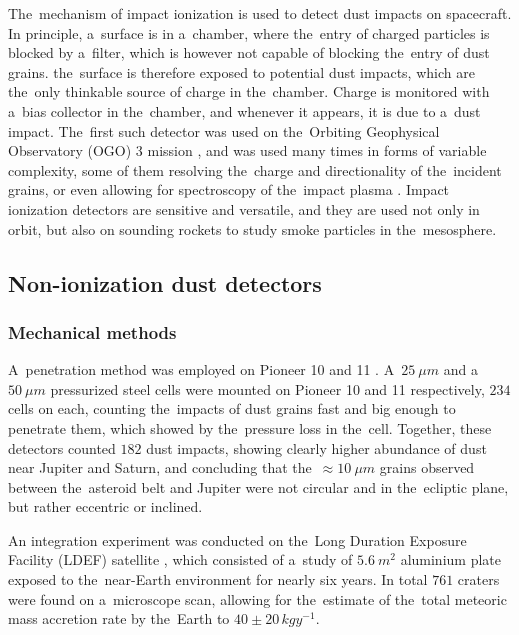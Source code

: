 The~mechanism of impact ionization is used to detect dust impacts on spacecraft. In principle, a~surface is in a~chamber, where the~entry of charged particles is blocked by a~filter, which is however not capable of blocking the~entry of dust grains.  the~surface is therefore exposed to potential dust impacts, which are the~only thinkable source of charge in the~chamber. Charge is monitored with a~bias collector in the~chamber, and whenever it appears, it is due to a~dust impact. The~first such detector was used on the~Orbiting Geophysical Observatory ({OGO}) 3 mission \citep{alexander1968zodiacal}, and was used many times in forms of variable complexity, some of them resolving the~charge and directionality \citep{grun1992galileo,grun1992ulysses,berg1969pioneer} of the~incident grains, or even allowing for spectroscopy of the~impact plasma \citep{srama2004cassini,sommer2023measuring}. Impact ionization detectors are sensitive and versatile, and they are used not only in orbit, but also on sounding rockets \citep{gunnarsdottir2019charging,trollvik2019observation} to study smoke particles in the~mesosphere. 

\subsection{Non-ionization dust detectors}

\subsubsection{Mechanical methods} 

A~penetration method was employed on Pioneer 10 and 11 \citep{humes1980results}. A~$\SI{25}{\mu m}$ and a~$\SI{50}{\mu m}$ pressurized steel cells were mounted on Pioneer 10 and 11 respectively, $234$ cells on each, counting the~impacts of dust grains fast and big enough to penetrate them, which showed by the~pressure loss in the~cell. Together, these detectors counted $182$ dust impacts, showing clearly higher abundance of dust near Jupiter and Saturn, and concluding that the~$\approx \SI{10}{\mu m}$ grains observed between the~asteroid belt and Jupiter were not circular and in the~ecliptic plane, but rather eccentric or inclined. 

An integration experiment was conducted on the~Long Duration Exposure Facility ({LDEF}) satellite \citep{love1993direct}, which consisted of a~study of $\SI{5.6}{m^2}$ aluminium plate exposed to the~near-Earth environment for nearly six years. In total $761$ craters were found on a~microscope scan, allowing for the~estimate of the~total meteoric mass accretion rate by the~Earth to $40 \pm 20 \, \si{kg y^{-1}}$. 

